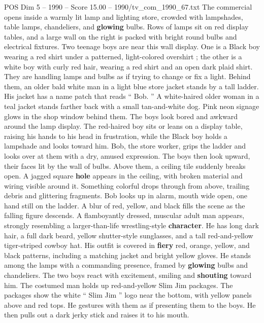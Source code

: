 \begin{textsample}{POS Dim 5 – 1990 – Score 15.00 – 1990/tv\_com\_1990\_67.txt}  \label{ex:f5_pos_006}
The commercial opens inside a warmly lit lamp and lighting store, crowded with lampshades, table lamps, chandeliers, and \textbf{glowing} bulbs.
Rows of lamps sit on red display tables, and a large wall on the right is packed with bright round bulbs and electrical fixtures.
Two teenage boys are near this wall display.
One is a Black boy wearing a red shirt under a patterned, light-colored overshirt ; the other is a white boy with curly red hair, wearing a red shirt and an open dark plaid shirt.
They are handling lamps and bulbs as if trying to change or fix a light.
Behind them, an older bald white man in a light blue store jacket stands by a tall ladder.
His jacket has a name patch that reads “ Bob. ” A white-haired older woman in a teal jacket stands farther back with a small tan-and-white dog.
Pink neon signage glows in the shop window behind them.
The boys look bored and awkward around the lamp display.
The red-haired boy sits or leans on a display table, raising his hands to his head in frustration, while the Black boy holds a lampshade and looks toward him.
Bob, the store worker, grips the ladder and looks over at them with a dry, amused expression.
The boys then look upward, their faces lit by the wall of bulbs.
Above them, a ceiling tile suddenly breaks open.
A jagged square \textbf{hole} appears in the ceiling, with broken material and wiring visible around it.
Something colorful drops through from above, trailing debris and glittering fragments.
Bob looks up in alarm, mouth wide open, one hand still on the ladder.
A blur of red, yellow, and black fills the scene as the falling figure descends.
A flamboyantly dressed, muscular adult man appears, strongly resembling a larger-than-life wrestling-style \textbf{character}.
He has long dark hair, a full dark beard, yellow shutter-style sunglasses, and a tall red-and-yellow tiger-striped cowboy hat.
His outfit is covered in \textbf{fiery} red, orange, yellow, and black patterns, including a matching jacket and bright yellow gloves.
He stands among the lamps with a commanding presence, framed by \textbf{glowing} bulbs and chandeliers.
The two boys react with excitement, smiling and \textbf{shouting} toward him.
The costumed man holds up red-and-yellow Slim Jim packages.
The packages show the white “ Slim Jim ” logo near the bottom, with yellow panels above and red tops.
He gestures with them as if presenting them to the boys.
He then pulls out a dark jerky stick and raises it to his mouth.

\end{textsample}
